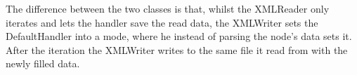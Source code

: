 The difference between the two classes is that, whilst the XMLReader only iterates and lets the handler save the read data, the XMLWriter sets 
the DefaultHandler into a mode, where he instead of parsing the node’s data sets it. After the iteration the XMLWriter writes to the same file 
it read from with the newly filled data.


